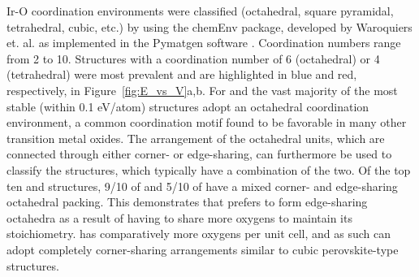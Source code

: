 %
Ir-O coordination environments were classified
(octahedral, square pyramidal, tetrahedral, cubic, etc.)
by using the chemEnv package, developed by Waroquiers et. al. \cite{Waroquiers2017} as implemented in the Pymatgen software \cite{Ong2013}.
%
Coordination numbers range from 2 to 10.
Structures with a coordination number of 6 (octahedral) or 4 (tetrahedral) were most prevalent and are highlighted in blue and red, respectively, in Figure~\ref{fig:E_vs_V}a,b.
%
For \IrOtwo and \IrOthree the vast majority of the most stable (within \num{0.1} eV/atom) structures adopt an octahedral coordination environment,
a common coordination motif found to be favorable in many other transition metal oxides.\cite{Waroquiers2017}
%
The arrangement of the octahedral units, which are connected through either corner- or edge-sharing,
can furthermore be used to classify the structures,
which typically have a combination of the two.
%
Of the top ten \IrOtwo and \IrOthree structures, 9/10 of \IrOtwo and 5/10 of \IrOthree have a mixed corner- and edge-sharing octahedral packing.
%
This demonstrates that \IrOtwo prefers to form edge-sharing octahedra as a result of having to share more oxygens to maintain its stoichiometry.
%
\IrOthree has comparatively more oxygens per unit cell, and as such can adopt completely corner-sharing arrangements similar to cubic perovskite-type structures.


